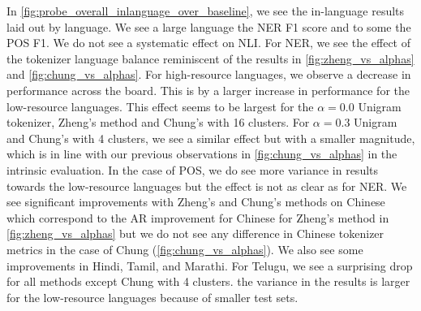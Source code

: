 In \autoref{fig:probe_overall_inlanguage_over_baseline}, we see the in-language results laid out by language. We see a large  language  the NER F1 score and to some  the POS F1. We do not see a systematic effect on NLI. For NER, we see the effect of the tokenizer language balance reminiscent of the results in \autoref{fig:zheng_vs_alphas} and \autoref{fig:chung_vs_alphas}. For high-resource languages, we observe a decrease in performance across the board.
This is  by a larger increase in performance for the low-resource languages. This effect seems to be largest for the $\alpha=0.0$ Unigram tokenizer, Zheng's method and Chung's with 16 clusters. For $\alpha=0.3$ Unigram and Chung's with 4 clusters, we see a similar effect but with a smaller magnitude, which is in line with our previous observations in \autoref{fig:chung_vs_alphas} in the intrinsic evaluation. In the case of POS, we do see more variance in results towards the low-resource languages but the effect is not as clear as for NER. We see significant improvements with  Zheng's and Chung's methods on Chinese which correspond to the AR improvement for Chinese for Zheng's method in \autoref{fig:zheng_vs_alphas} but we do not see any difference in Chinese tokenizer metrics in the case of Chung (\autoref{fig:chung_vs_alphas}). We also see some improvements in Hindi, Tamil, and Marathi. For Telugu, we see a surprising drop for all methods except Chung with 4 clusters.
 the variance in the results is larger for the low-resource languages because of smaller test sets.


